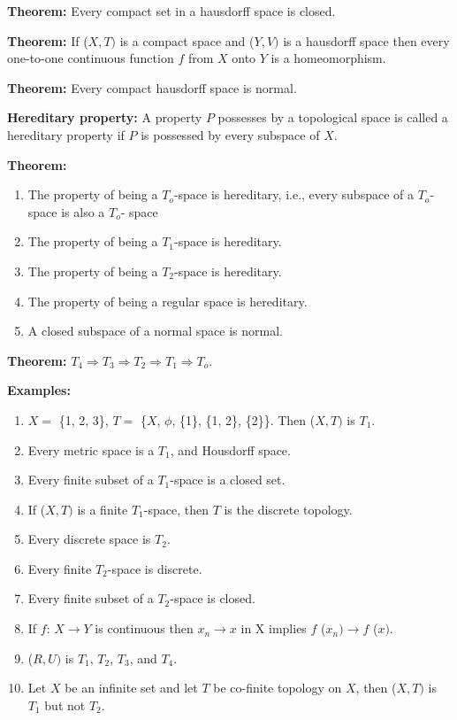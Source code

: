\documentclass[12pt]{amsart}
\begin{document}
\textbf{Theorem:} Every compact set in a hausdorff space is closed.

\textbf{Theorem:} If ($X, T)$ is a compact space and ($Y, V)$ is a hausdorff space then 
every one-to-one continuous function $f$ from $X$ onto $Y$ is a homeomorphism.

\textbf{Theorem:} Every compact hausdorff space is normal.

\textbf{Hereditary property:} A property $P$ possesses by a topological space 
is called a hereditary property if $P$ is possessed by every subspace of $X$.

\textbf{Theorem:} 

\begin{enumerate}
\item The property of being a $T_{o}$-space is hereditary, i.e., every subspace of a $T_{o}$-space is also a $T_{o}$- space
\item The property of being a $T_{1}$-space is hereditary.
\item The property of being a $T_{2}$-space is hereditary.
\item The property of being a regular space is hereditary.
\item A closed subspace of a normal space is normal.
\end{enumerate}

\textbf{Theorem:} $T_{4}\Rightarrow T_{3}\Rightarrow 
T_{2}\Rightarrow T_{1}\Rightarrow T_{o}$.

\textbf{Examples:} 

\begin{enumerate}
\item $X =$ {\{}1, 2, 3{\}}, $T =$ {\{}$X$, $\phi $, {\{}1{\}}, {\{}1, 2{\}}, {\{}2{\}}{\}}. Then ($X, T)$ is $T_{1}$.
\item Every metric space is a $T_{1}$, and Housdorff space.
\item Every finite subset of a $T_{1}$-space is a closed set.
\item If ($X, T)$ is a finite $T_{1}$-space, then $T$ is the discrete topology. 
\item Every discrete space is $T_{2}$.
\item Every finite $T_{2}$-space is discrete.
\item Every finite subset of a $T_{2}$-space is closed.
\item If $f $: $X\to Y$ is continuous then $x_{n}\to x$ in X implies $f$ ($x_{n})\to f$ ($x)$.
\item ($R, U)$ is $T_{1}$, $T_{2}$, $T_{3}$, and $T_{4}$.
\item Let $X$ be an infinite set and let $T$ be co-finite topology on $X$, then ($X, T)$ is $T_{1}$ but not $T_{2}$.
\end{enumerate}
\end{document}
